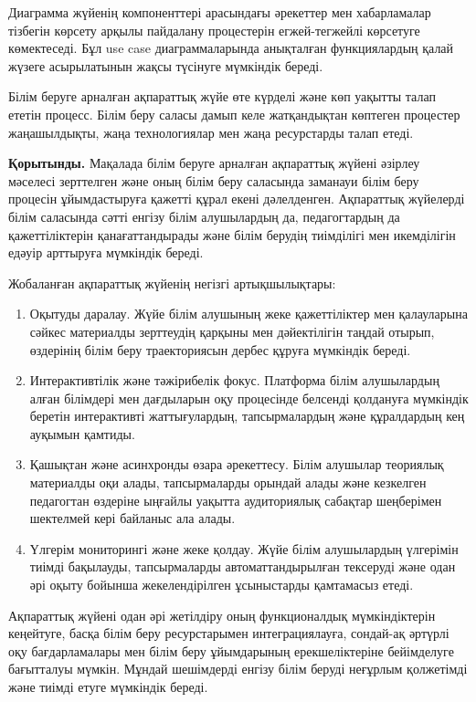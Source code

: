 \begin{multicols}{2}
Диаграмма жүйенің компоненттері арасындағы әрекеттер мен хабарламалар
тізбегін көрсету арқылы пайдалану процестерін егжей-тегжейлі көрсетуге
көмектеседі. Бұл use case диаграммаларында анықталған функциялардың
қалай жүзеге асырылатынын жақсы түсінуге мүмкіндік береді.

Білім беруге арналған ақпараттық жүйе өте күрделі және көп уақытты талап
ететін процесс. Білім беру саласы дамып келе жатқандықтан көптеген
процестер жаңашылдықты, жаңа технологиялар мен жаңа ресурстарды талап
етеді.

{\bfseries Қорытынды.} Мақалада білім беруге арналған ақпараттық жүйені
әзірлеу мәселесі зерттелген және оның білім беру саласында заманауи
білім беру процесін ұйымдастыруға қажетті құрал екені дәлелденген.
Ақпараттық жүйелерді білім саласында сәтті енгізу білім алушылардың да,
педагогтардың да қажеттіліктерін қанағаттандырады және білім берудің
тиімділігі мен икемділігін едәуір арттыруға мүмкіндік береді.

Жобаланған ақпараттық жүйенің негізгі артықшылықтары:

\begin{enumerate}
\def\labelenumi{\arabic{enumi}.}
\item
  Оқытуды даралау. Жүйе білім алушының жеке қажеттіліктер мен
  қалауларына сәйкес материалды зерттеудің қарқыны мен дәйектілігін
  таңдай отырып, өздерінің білім беру траекториясын дербес құруға
  мүмкіндік береді.
\item
  Интерактивтілік және тәжірибелік фокус. Платформа білім алушылардың
  алған білімдері мен дағдыларын оқу процесінде белсенді қолдануға
  мүмкіндік беретін интерактивті жаттығулардың, тапсырмалардың және
  құралдардың кең ауқымын қамтиды.
\item
  Қашықтан және асинхронды өзара әрекеттесу. Білім алушылар теориялық
  материалды оқи алады, тапсырмаларды орындай алады және кезкелген
  педагогтан өздеріне ыңғайлы уақытта аудиториялық сабақтар шеңберімен
  шектелмей кері байланыс ала алады.
\item
  Үлгерім мониторингі және жеке қолдау. Жүйе білім алушылардың үлгерімін
  тиімді бақылауды, тапсырмаларды автоматтандырылған тексеруді және одан
  әрі оқыту бойынша жекелендірілген ұсыныстарды қамтамасыз етеді.
\end{enumerate}

Ақпараттық жүйені одан әрі жетілдіру оның функционалдық мүмкіндіктерін
кеңейтуге, басқа білім беру ресурстарымен интеграциялауға, сондай-ақ
әртүрлі оқу бағдарламалары мен білім беру ұйымдарының ерекшеліктеріне
бейімделуге бағытталуы мүмкін. Мұндай шешімдерді енгізу білім беруді
неғұрлым қолжетімді және тиімді етуге мүмкіндік береді.
\end{multicols}

